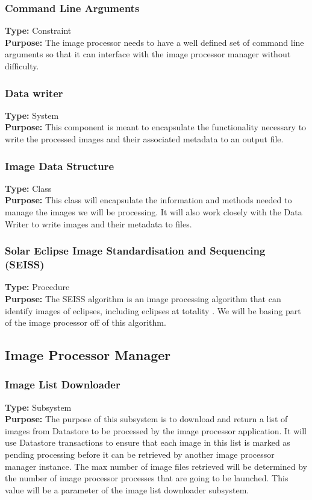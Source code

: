 \documentclass[10pt, onecolumn, draftclsnofoot, letterpaper, compsoc]{IEEEtran}
\begin{document}
\subsubsection{Command Line Arguments}
\textbf{Type:} Constraint\\
\textbf{Purpose:} The image processor needs to have a well defined set of
command line arguments so that it can interface with the image processor
manager without difficulty. \\

\subsubsection{Data writer}
\textbf{Type:} System\\
\textbf{Purpose:} This component is meant to encapsulate the functionality
necessary to write the processed images and their associated metadata to an
output file.\\

\subsubsection{Image Data Structure}
\textbf{Type:} Class\\
\textbf{Purpose:} This class will encapsulate the information and methods needed
to manage the images we will be processing. It will also work closely with the
Data Writer to write images and their metadata to files.\\

\subsubsection{Solar Eclipse Image Standardisation and Sequencing (SEISS)}
\textbf{Type:} Procedure\\
\textbf{Purpose:} The SEISS algorithm is an image processing algorithm that can
identify images of eclipses, including eclipses at totality \cite{imgKrista}. We
will be basing part of the image processor off of this algorithm. \\

\subsection{Image Processor Manager}

    \subsubsection{Image List Downloader}
    \textbf{Type:} Subsystem \\
    \textbf{Purpose:} The purpose of this subsystem is to download and return a list of images from Datastore
    to be processed by the image processor application. It will use Datastore transactions to ensure that each
    image in this list is marked as pending processing before it can be retrieved by another image processor
    manager instance. The max number of image files retrieved will be determined by the number of image
    processor processes that are going to be launched. This value will be a parameter of the image list
    downloader subsystem. \\
\end{document}
